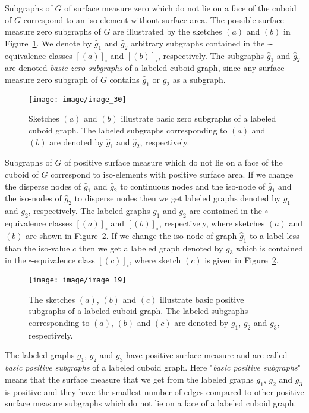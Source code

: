 \documentclass[a4paper,11pt]{article}
\begin{document}
Subgraphs of $G$ of surface measure zero which do not lie on a face of the cuboid of $G$ correspond to an
iso-element without surface area. The possible surface measure zero subgraphs of $G$
are illustrated by the sketches $(a)$ and $(b)$ in Figure~\ref{image_30}. We denote by $\hat{g}_1$ and
$\hat{g}_2$ arbitrary subgraphs contained in the $\square$-equivalence classes $[(a)]_{\square}$ and
$[(b)]_{\square}$, respectively. The subgraphs $\hat{g}_1$ and $\hat{g}_2$ are denoted {\it basic
zero subgraphs} of a labeled cuboid graph, since any surface measure zero subgraph of $G$ contains $\hat{g}_1$
or $\hat{g}_2$ as a subgraph.
\begin{figure}[!ht]
\texttt{[image: image/image\_30]}
\caption{Sketches $(a)$ and $(b)$ illustrate basic zero subgraphs of a labeled cuboid graph. The
labeled subgraphs corresponding to $(a)$ and $(b)$ are denoted by $\hat{g}_1$ and $\hat{g}_2$,
respectively.}
\label{image_30}
\end{figure}
\FloatBarrier
Subgraphs of $G$ of positive surface measure which do not lie on a face of the cuboid of $G$ correspond
to iso-elements with positive surface area. If we change the disperse nodes of $\hat{g}_1$ and
$\hat{g}_2$ to continuous nodes and the iso-node of $\hat{g}_1$ and the iso-nodes of $\hat{g}_2$ to disperse
nodes then we get labeled graphs denoted by $g_1$ and $g_2$, respectively. The labeled graphs $g_1$ and $g_2$
are contained in the $\circ$-equivalence classes $[(a)]_{\circ}$ and $[(b)]_{\circ}$, respectively,
where sketches $(a)$ and $(b)$ are shown in Figure~\ref{image_19}. If we change the iso-node of graph
$\hat{g}_1$ to a label less than the iso-value $c$ then we get a labeled graph denoted by $g_3$ which
is contained in the $\square$-equivalence class $[(c)]_{\square}$, where sketch $(c)$ is given in
Figure~\ref{image_19}.
\begin{figure}[!ht]
\texttt{[image: image/image\_19]}
\caption{The sketches $(a)$, $(b)$ and  $(c)$ illustrate basic positive subgraphs of a labeled cuboid graph.
The labeled subgraphs corresponding to $(a)$, $(b)$ and  $(c)$ are denoted by $g_1$, $g_2$ and $g_3$,
respectively.}
\label{image_19}
\end{figure}
\FloatBarrier
The labeled graphs $g_1$, $g_2$ and $g_3$ have positive surface measure and are called {\it basic positive subgraphs}
of a labeled cuboid graph. Here "{\it basic positive subgraphs}" means that the surface measure that we get
from the labeled graphs $g_1$, $g_2$ and $g_3$ is positive and they have the smallest number of edges compared to
other positive surface measure subgraphs which do not lie on a face of a labeled cuboid graph.
\end{document}
